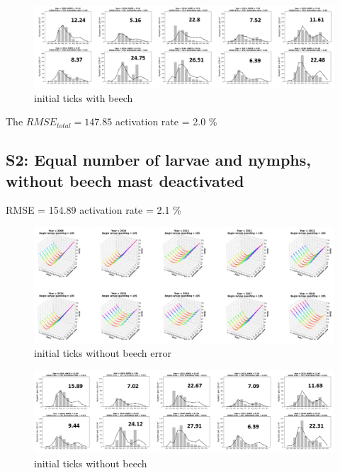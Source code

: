 \documentclass[a4paper, 11pt]{scrartcl}
\begin{document}
\begin{figure}[h!]
\centering
\includegraphics[width=1.0\textwidth]{figures/initial_ticks_with_beech.PNG}
\caption{initial ticks with beech}
\label{fig:initial_ticks_with_beech}
\end{figure}

The $RMSE_{total} = 147.85$
activation rate = 2.0 \%

\newpage
\subsection{S2: Equal number of larvae and nymphs, without beech mast deactivated}
RMSE = 154.89
activation rate = 2.1 \%

\begin{figure}[h!]
\centering
\includegraphics[width=1.0\textwidth]{figures/initial_ticks_without_beech_error.PNG}
\caption{initial ticks without beech error}
\label{fig:initial_ticks_without_beech_error}
\end{figure}

\begin{figure}[h!]
\centering
\includegraphics[width=1.0\textwidth]{figures/initial_ticks_without_beech.PNG}
\caption{initial ticks without beech}
\label{fig:initial_ticks_without_beech}
\end{figure}
\end{document}
